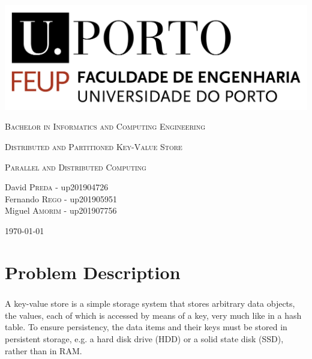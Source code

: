 \documentclass{report}
\begin{document}
	\begin{titlepage}
		\centering
		\includegraphics[scale=0.35]{logo_feup.png}\linebreak
		
		\vspace{1cm}
		
		{\scshape \large Bachelor in Informatics and Computing Engineering}
		
		\vspace {1cm}
		
		{\scshape\Huge Distributed and Partitioned Key-Value Store \par}
		
		\vfill
		
		{\scshape \large Parallel and Distributed Computing}
		
		\vfill
		
		\Large David \textsc{Preda} - up201904726 \\ Fernando
		\textsc{Rego} - up201905951 \\ Miguel \textsc{Amorim} - up201907756
		
		\vspace{1cm}
		
		\today
		
	\end{titlepage}

	\tableofcontents
	
	\chapter{Problem Description}
			\paragraph{} A key-value store is a simple storage system that stores
			arbitrary data objects, the values, each of which is accessed by means
			of a key, very much like in a hash table. To ensure persistency, the data
			items and their keys must be stored in persistent storage, e.g. a hard
			disk drive (HDD) or a solid state disk (SSD), rather than in RAM.
			
\end{document}
